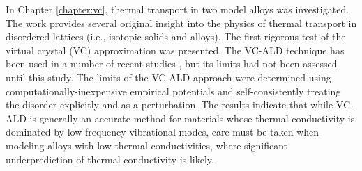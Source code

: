 In Chapter \ref{chapter:vc}, thermal transport in two model alloys 
was investigated. The work provides several original 
insight into the physics of thermal 
transport in disordered lattices (i.e., isotopic solids and alloys). 
The first rigorous test of the virtual crystal (VC) approximation 
was presented. The VC-ALD technique has been used in a number of 
recent studies 
\cite{garg_role_2011,tian_phonon_2012,lindsay_thermal_2012,
li_thermal_2012,luckyanova_coherent_2012}, 
but its limits had not been assessed until this study.  
The limits of the VC-ALD 
approach were determined using computationally-inexpensive empirical 
potentials and self-consistently treating the disorder explicitly 
and as a perturbation. 
The results indicate that while VC-ALD is generally 
an accurate method for materials 
whose thermal conductivity is dominated by low-frequency vibrational 
modes, care must be taken when modeling alloys with low thermal 
conductivities, where significant underprediction of thermal 
conductivity is likely. 


